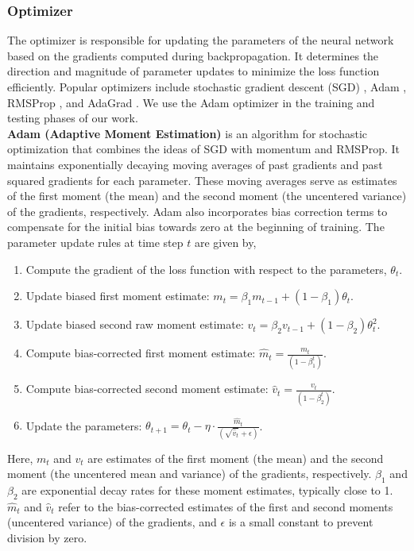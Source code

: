 \subsubsection{Optimizer} 
The optimizer is responsible for updating the parameters of the neural network based on the gradients computed during backpropagation. It determines the direction and magnitude of parameter updates to minimize the loss function efficiently. Popular optimizers include stochastic gradient descent (SGD) \cite{sgd}, Adam \cite{adam}, RMSProp \cite{rmsprop}, and AdaGrad \cite{adagrad}. We use the Adam optimizer in the training and testing phases of our work. \\
 \textbf{Adam (Adaptive Moment Estimation)} is an algorithm for stochastic optimization that combines the ideas of SGD with momentum and RMSProp. It maintains exponentially decaying moving averages of past gradients and past squared gradients for each parameter. These moving averages serve as estimates of the first moment (the mean) and the second moment (the uncentered variance) of the gradients, respectively. Adam also incorporates bias correction terms to compensate for the initial bias towards zero at the beginning of training. The parameter update rules at time step $t$ are given by,
 \begin{enumerate}
  \item Compute the gradient of the loss function with respect to the parameters, \(\theta_t\).
  \item Update biased first moment estimate: \(m_t = \beta_1 m_{t-1} + (1 - \beta_1)\theta_t\).
  \item Update biased second raw moment estimate: \(v_t = \beta_2 v_{t-1} + (1 - \beta_2)\theta_t^2\).
  \item Compute bias-corrected first moment estimate: \(\hat{m}_t = \frac{m_t}{(1 - \beta_1^t)}\).
  \item Compute bias-corrected second moment estimate: \(\hat{v}_t = \frac{v_t}{(1 - \beta_2^t)}\).
  \item Update the parameters: \(\theta_{t+1} = \theta_t - \eta \cdot \frac{\hat{m}_t}{(\sqrt{\hat{v}_t} + \epsilon)}\).
\end{enumerate}
Here, \(m_t\) and \(v_t\) are estimates of the first moment (the mean) and the second moment (the uncentered mean and variance) of the gradients, respectively. \(\beta_1\) and \(\beta_2\) are exponential decay rates for these moment estimates, typically close to 1. $\hat{m}_t$ and $\hat{v}_t$ refer to the bias-corrected estimates of the first and second moments (uncentered variance) of the gradients, and $\epsilon$ is a small constant to prevent division by zero.

